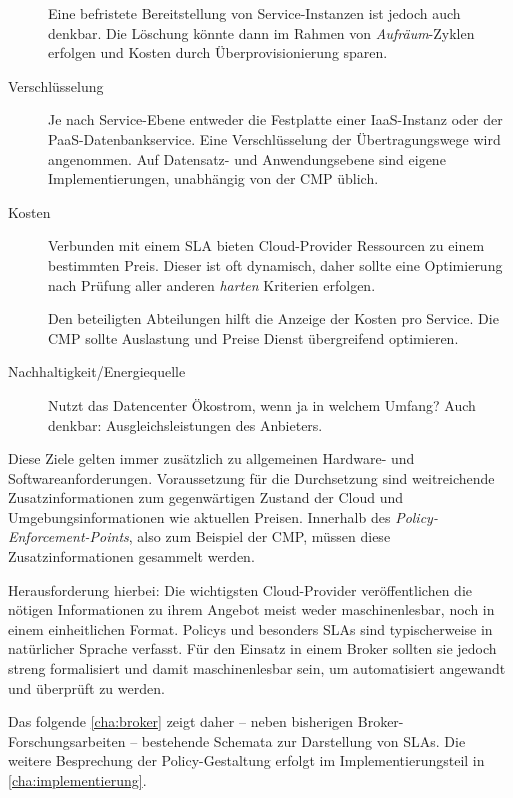 \begin{description}
	Eine befristete Bereitstellung von Service-Instanzen ist jedoch auch denkbar. Die Löschung könnte dann im Rahmen von \emph{Aufräum}-Zyklen erfolgen und Kosten durch Überprovisionierung sparen.
	
	\item[Verschlüsselung] Je nach Service-Ebene entweder die Festplatte einer IaaS-Instanz oder der PaaS-Datenbankservice. Eine Verschlüsselung der Übertragungswege wird angenommen. Auf Datensatz- und Anwendungsebene sind eigene Implementierungen, unabhängig von der CMP üblich.
	
	\item[Kosten] Verbunden mit einem SLA bieten Cloud-Provider Ressourcen zu einem bestimmten Preis. Dieser ist oft dynamisch, daher sollte eine Optimierung nach Prüfung aller anderen \emph{harten} Kriterien erfolgen.
	
	Den beteiligten Abteilungen hilft die Anzeige der Kosten pro Service. Die CMP sollte Auslastung und Preise Dienst übergreifend optimieren.
	
	\item[Nachhaltigkeit/Energiequelle] Nutzt das Datencenter Ökostrom, wenn ja in welchem Umfang? Auch denkbar: Ausgleichsleistungen des Anbieters.
	
	
\end{description}

\noindent 
Diese Ziele gelten immer zusätzlich zu allgemeinen Hardware- und Softwareanforderungen. Voraussetzung für die Durchsetzung sind weitreichende Zusatzinformationen zum gegenwärtigen Zustand der Cloud und Umgebungsinformationen wie aktuellen Preisen. Innerhalb des \emph{Policy-Enforcement-Points}, also zum Beispiel der CMP, müssen diese Zusatzinformationen gesammelt werden.

Herausforderung hierbei: Die wichtigsten Cloud-Provider veröffentlichen die nötigen Informationen zu ihrem Angebot meist weder maschinenlesbar, noch in einem einheitlichen Format.
Policys und besonders SLAs sind typischerweise in natürlicher Sprache verfasst. Für den Einsatz in einem Broker sollten sie jedoch streng formalisiert und damit maschinenlesbar sein, um automatisiert angewandt und überprüft zu werden.

Das folgende \autoref{cha:broker} zeigt daher -- neben bisherigen Broker-Forschungsarbeiten -- bestehende Schemata zur Darstellung von SLAs. Die weitere Besprechung der Policy-Gestaltung erfolgt im Implementierungsteil in \autoref{cha:implementierung}.